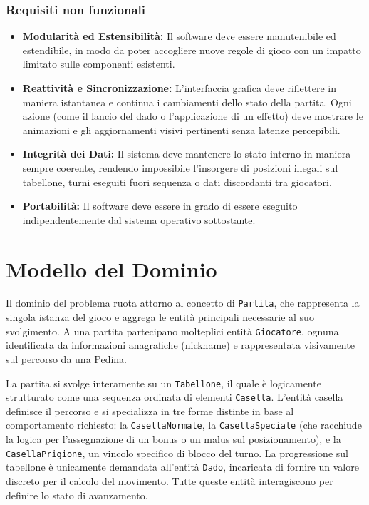 \documentclass[a4paper,12pt]{report}
\begin{document}
\subsubsection{Requisiti non funzionali}
\begin{itemize}
	\item \textbf{Modularità ed Estensibilità:} Il software deve essere manutenibile ed estendibile, in modo da poter accogliere nuove regole di gioco con un impatto limitato sulle componenti esistenti.
    \item \textbf{Reattività e Sincronizzazione:} L'interfaccia grafica deve riflettere in maniera istantanea e continua i cambiamenti dello stato della partita. Ogni azione (come il lancio del dado o l'applicazione di un effetto) deve mostrare le animazioni e gli aggiornamenti visivi pertinenti senza latenze percepibili.
    \item \textbf{Integrità dei Dati:} Il sistema deve mantenere lo stato interno in maniera sempre coerente, rendendo impossibile l'insorgere di posizioni illegali sul tabellone, turni eseguiti fuori sequenza o dati discordanti tra giocatori.
    \item \textbf{Portabilità:} Il software deve essere in grado di essere eseguito indipendentemente dal sistema operativo sottostante.
\end{itemize}


\section{Modello del Dominio}

Il dominio del problema ruota attorno al concetto di \texttt{Partita}, che rappresenta la singola istanza del gioco e aggrega le entità principali necessarie al suo svolgimento. A una partita partecipano molteplici entità \texttt{Giocatore}, ognuna identificata da informazioni anagrafiche (nickname) e rappresentata visivamente sul percorso da una Pedina.

La partita si svolge interamente su un \texttt{Tabellone}, il quale è logicamente strutturato come una sequenza ordinata di elementi \texttt{Casella}. L'entità casella definisce il percorso e si specializza in tre forme distinte in base al comportamento richiesto: la \texttt{CasellaNormale}, la \texttt{CasellaSpeciale} (che racchiude la logica per l'assegnazione di un bonus o un malus sul posizionamento), e la \texttt{CasellaPrigione}, un vincolo specifico di blocco del turno. La progressione sul tabellone è unicamente demandata all'entità \texttt{Dado}, incaricata di fornire un valore discreto per il calcolo del movimento. Tutte queste entità interagiscono per definire lo stato di avanzamento.
\end{document}
